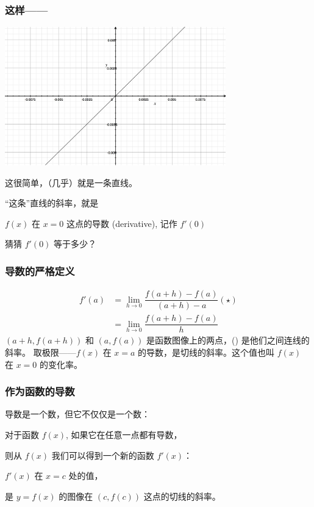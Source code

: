 \documentclass[CJK]{beamer}
\begin{document}
\begin{frame}
\frametitle{这样——}
\begin{center}
\includegraphics[height=6cm]{graph2.jpeg}
\end{center}
这很\alert{简单}，（几乎）就是一条\alert{直线}。
\end{frame}

\begin{frame}
``这条''直线的\alert{斜率}，就是
\begin{center}
$f(x)$ 在 $x = 0$ 这点的\alert{导数} (derivative), 记作 $f'(0)$
\end{center}

猜猜 $f'(0)$ 等于多少？
\end{frame}

\begin{frame}
\frametitle{导数的严格定义}
\[
\begin{split}
	f'(a) &= \lim_{h\to 0} \dfrac{f(a+h) - f(a)}{(a + h) - a}(\star)\\
	&= \lim_{h\to 0} \dfrac{f(a+h) - f(a)}{h} 
\end{split}
\]
$(a + h, f(a + h))$ 和 $(a, f(a))$ 是函数图像上的两点，(\star) 是他们之间连线的斜率。
取极限——$f(x)$ 在 $x = a$ 的\alert{导数}，是\alert{切线的斜率}。这个值也叫 $f(x)$ 在 $x = 0$ 的\alert{变化率}。
\end{frame}

\begin{frame}
\frametitle{作为函数的导数}
导数是一个数，但它\alert{不仅仅是一个数}：

对于函数 $f(x)$, 如果它在任意一点都有导数，

则从 $f(x)$ 我们可以得到一个\alert{新的}函数 $f'(x)$：

\vspace{1em}

$f'(x)$ 在 $x = c$ 处的值，

是 $y = f(x)$ 的图像在 $(c, f(c))$ 这点的\alert{切线的斜率}。
\end{frame}
\end{document}
